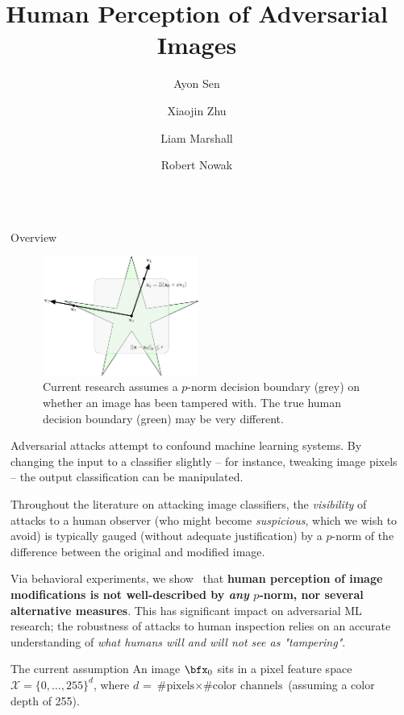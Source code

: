 \documentclass[final,notheorems]{beamer}
\title{Human Perception of Adversarial Images}
\author{Ayon Sen \inst{1} \and Xiaojin Zhu \inst{1} \and Liam Marshall \inst{1} \and Robert Nowak \inst{1}}
\institute[shortinst]{\inst{1} University of Wisconsin-Madison}
\newlength{\sepwidth}
\newlength{\colwidth}
\newcommand{\separatorcolumn}{\begin{column}{\sepwidth}\end{column}}
\def\X{\mathcal X}
\begin{document}
\begin{frame}[t]
\begin{columns}[t]
\separatorcolumn

\begin{column}{\colwidth}
  \begin{block}{Overview}
    \begin{figure}
      \centering
      \includegraphics[width=0.48\textwidth]{fig/intro_image-figure0.eps}
      \caption{Current research assumes a $p$-norm decision boundary (grey) on whether an image has been tampered with. The true human decision boundary (green) may be very different.}
      \label{fig:decision_boundary}
    \end{figure}
    Adversarial attacks attempt to confound machine learning systems. By changing the input to a classifier slightly -- for instance, tweaking image pixels -- the output classification can be manipulated.

    Throughout the literature on attacking image classifiers, the \emph{visibility} of attacks to a human observer (who might become \emph{suspicious}, which we wish to avoid) is typically gauged (without adequate justification) by a $p$-norm of the difference between the original and modified image.

    Via behavioral experiments, we show~\cite{sen2019perception} that \textbf{human perception of image modifications is not well-described by \emph{any} $p$-norm, nor several alternative measures}.
    This has significant impact on adversarial ML research; the robustness of attacks to human inspection relies on an accurate understanding of \emph{what humans will and will not see as "tampering"}.

  \end{block}

  \begin{alertblock}{The current assumption}
    An image $\bfx_0$ sits in a pixel feature space $\X = \{0,\ldots,255\}^d$, where $d$ = $\text{\# pixels} \times \text{\# color channels}$ (assuming a color depth of 255).


\end{alertblock}
\end{column}
\end{columns}
\end{frame}
\end{document}
